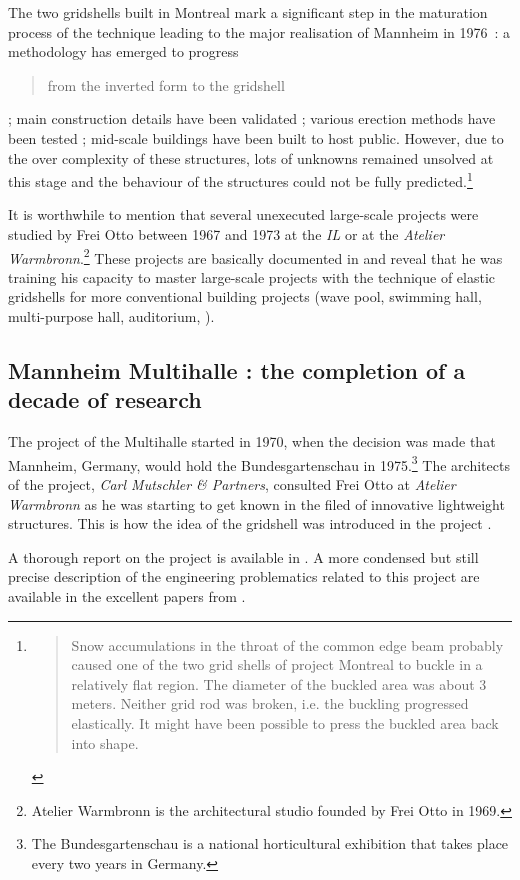 The two gridshells built in Montreal mark a significant step in the maturation process of the technique leading to the major realisation of Mannheim in 1976~: a methodology has emerged to progress \blockcquote[p.~179]{IL10}{from the inverted form to the gridshell} ; main construction details have been validated ; various erection methods have been tested ; mid-scale buildings have been built to host public. However, due to the over complexity of these structures, lots of unknowns remained unsolved at this stage and the behaviour of the structures could not be fully predicted.\footnote{\blockcquote[p.~219]{IL10}{Snow accumulations in the throat of the common edge beam probably caused one of the two grid shells of project Montreal to buckle in a relatively flat region. The diameter of the buckled area was about 3 meters. Neither grid rod was broken, i.e. the buckling progressed elastically. It might have been possible to press the buckled area back into shape.}}

It is worthwhile to mention that several unexecuted large-scale projects were studied by Frei Otto between 1967 and 1973 at the \emph{IL} or at the \emph{Atelier Warmbronn}.\footnote{Atelier Warmbronn is the architectural studio founded by Frei Otto in 1969.} These projects are basically documented in \cite[pp.~278 - 288]{IL10} and reveal that he was training his capacity to master large-scale projects with the technique of elastic gridshells for more conventional building projects (wave pool, swimming hall, multi-purpose hall, auditorium, \telp{}).


\subsection{Mannheim Multihalle : the completion of a decade of research}
The project of the Multihalle started in 1970, when the decision was made that Mannheim, Germany, would hold the Bundesgartenschau in 1975.\footnote{The Bundesgartenschau is a national horticultural exhibition that takes place every two years in Germany.} The architects of the project, \emph{Carl Mutschler \& Partners}, consulted Frei Otto at \emph{Atelier Warmbronn} as he was starting to get known in the filed of innovative lightweight structures. This is how the idea of the gridshell was introduced in the project \cite{Liddell2015}.

A thorough report on the project is available in \cite{IL13}.  A more condensed but still precise description of the engineering problematics related to this project are available in the excellent papers from \citet{Happold1975, Liddell2015}.

